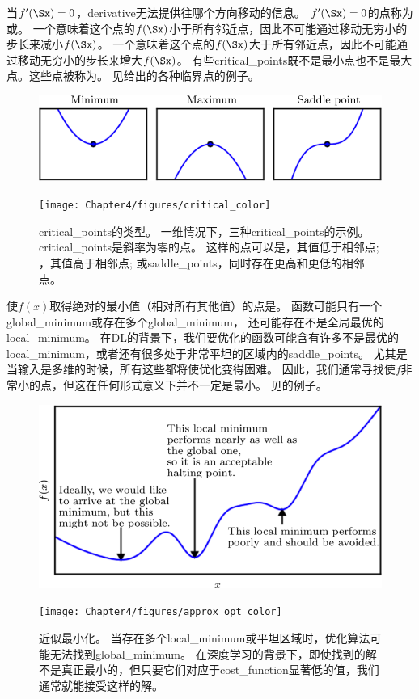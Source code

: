 当$f^\prime(\Sx)=0$，\gls{derivative}无法提供往哪个方向移动的信息。
$ f^\prime(\Sx)=0 $的点称为或。
一个意味着这个点的$f(\Sx)$小于所有邻近点，因此不可能通过移动无穷小的步长来减小$f(\Sx)$。
一个意味着这个点的$f(\Sx)$大于所有邻近点，因此不可能通过移动无穷小的步长来增大$f(\Sx)$。
有些\gls{critical_points}既不是最小点也不是最大点。这些点被称为。
见给出的各种临界点的例子。
\begin{figure}[!htb]
\ifOpenSource
\centerline{\includegraphics[scale=0.5]{images/25.png}}
\else
\centerline{\texttt{[image: Chapter4/figures/critical\_color]}}
\fi
\caption{\gls{critical_points}的类型。 
一维情况下，三种\gls{critical_points}的示例。
\gls{critical_points}是斜率为零的点。
这样的点可以是，其值低于相邻点; ，其值高于相邻点; 或\gls{saddle_points}，同时存在更高和更低的相邻点。
}
\label{fig:chap4_critical_color}
\end{figure}

使$f(x)$取得绝对的最小值（相对所有其他值）的点是。
函数可能只有一个\gls{global_minimum}或存在多个\gls{global_minimum}，
还可能存在不是全局最优的\gls{local_minimum}。
在\gls{DL}的背景下，我们要优化的函数可能含有许多不是最优的\gls{local_minimum}，或者还有很多处于非常平坦的区域内的\gls{saddle_points}。
尤其是当输入是多维的时候，所有这些都将使优化变得困难。
因此，我们通常寻找使$f$非常小的点，但这在任何形式意义下并不一定是最小。
见的例子。
\begin{figure}[!htb]
\ifOpenSource
\centerline{\includegraphics[scale=0.5]{images/26.png}}
\else
\centerline{\texttt{[image: Chapter4/figures/approx\_opt\_color]}}
\fi
\caption{近似最小化。 
当存在多个\gls{local_minimum}或平坦区域时，优化算法可能无法找到\gls{global_minimum}。
在深度学习的背景下，即使找到的解不是真正最小的，但只要它们对应于\gls{cost_function}显著低的值，我们通常就能接受这样的解。
}
\label{fig:chap4_approx_opt_color}
\end{figure}

